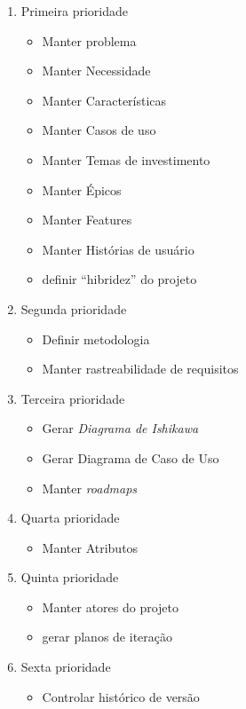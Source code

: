 \begin{enumerate}
	\item Primeira prioridade
		\begin{itemize}
			\item Manter problema
			\item Manter Necessidade
			\item Manter Características
			\item Manter Casos de uso
			\item Manter Temas de investimento
			\item Manter Épicos
			\item Manter Features
			\item Manter Histórias de usuário
			\item definir ``hibridez'' do projeto
		\end{itemize}
	\item Segunda prioridade
		\begin{itemize}
			\item Definir metodologia
			\item Manter rastreabilidade de requisitos
		\end{itemize}
	\item Terceira prioridade
		\begin{itemize}
			\item Gerar \textit{Diagrama de Ishikawa}
			\item Gerar Diagrama de Caso de Uso
			\item Manter \textit{roadmaps}
		\end{itemize}
	\item Quarta prioridade
		\begin{itemize}
			\item Manter Atributos
		\end{itemize}
	\item Quinta prioridade
		\begin{itemize}
			\item Manter atores do projeto
			\item gerar planos de iteração
		\end{itemize}
	\item Sexta prioridade
		\begin{itemize}
			\item Controlar histórico de versão
		\end{itemize}

\end{enumerate}